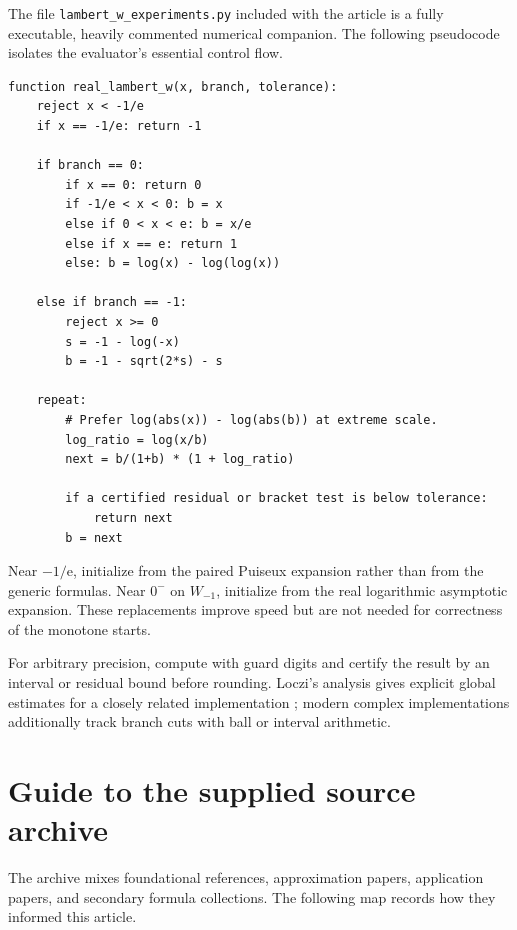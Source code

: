 \documentclass[11pt,oneside]{book}
\theoremstyle{definition}
\theoremstyle{remark}
\newcommand{\ee}{\mathrm e}
\begin{document}
The file \texttt{lambert\_w\_experiments.py} included with the article is a
fully executable, heavily commented numerical companion.  The following
pseudocode isolates the evaluator's essential control flow.

\begin{verbatim}
function real_lambert_w(x, branch, tolerance):
    reject x < -1/e
    if x == -1/e: return -1

    if branch == 0:
        if x == 0: return 0
        if -1/e < x < 0: b = x
        else if 0 < x < e: b = x/e
        else if x == e: return 1
        else: b = log(x) - log(log(x))

    else if branch == -1:
        reject x >= 0
        s = -1 - log(-x)
        b = -1 - sqrt(2*s) - s

    repeat:
        # Prefer log(abs(x)) - log(abs(b)) at extreme scale.
        log_ratio = log(x/b)
        next = b/(1+b) * (1 + log_ratio)

        if a certified residual or bracket test is below tolerance:
            return next
        b = next
\end{verbatim}

Near $-1/\ee$, initialize from the paired Puiseux expansion rather than from
the generic formulas.  Near $0^-$ on $W_{-1}$, initialize from the real
logarithmic asymptotic expansion.  These replacements improve speed but are
not needed for correctness of the monotone starts.

For arbitrary precision, compute with guard digits and certify the result by
an interval or residual bound before rounding.  Loczi's analysis gives
explicit global estimates for a closely related implementation
\cite{loczi2022}; modern complex implementations additionally track branch
cuts with ball or interval arithmetic.


\chapter{Guide to the supplied source archive}\label{app:sources}

The archive mixes foundational references, approximation papers, application
papers, and secondary formula collections.  The following map records how
they informed this article.
\end{document}
